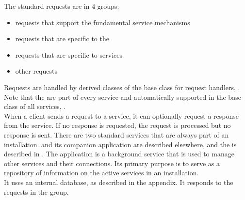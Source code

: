 The standard requests are in 4 groups:
\begin{itemize}
\item\textbf{} requests that support the
fundamental \mplusm{} service mechanisms
\item\exSp\textbf{}
requests that are specific to the 
\item\exSp\textbf{} requests
that are specific to  services
\item\exSp\textbf{} other
requests
\end{itemize}
Requests are handled by derived classes of the base class for request handlers,
.
Note that the  are part of every service and
automatically supported in the base class of all services,
.\\

When a client sends a request to a service, it can optionally request a response from the
service.
If no response is requested, the request is processed but no response is sent.
There are two standard services that are always part of an \mplusm{} installation.
 and its companion application
 are described elsewhere, and the
 is described in .
The  application is a background service that is used
to manage other services and their connections.
Its primary purpose is to serve as a repository of information on the active services in
an \mplusm{} installation.\\

It uses an internal database, as described in the
 appendix.
It responds to the requests in the
 group.\\

